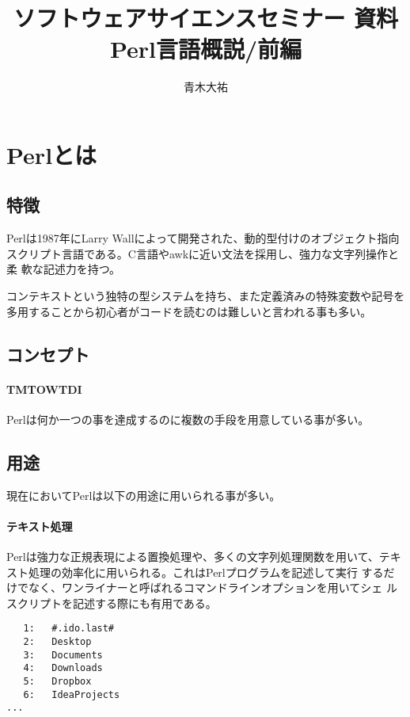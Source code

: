 \documentclass[a4paper,9pt]{jarticle}
\title{ソフトウェアサイエンスセミナー 資料 \\{\large{Perl言語概説/前編}}}
\author{青木大祐}
\begin{document}
\maketitle

\section{Perlとは}

\subsection{特徴}
Perlは1987年にLarry Wallによって開発された、動的型付けのオブジェクト指向
スクリプト言語である。C言語やawkに近い文法を採用し、強力な文字列操作と柔
軟な記述力を持つ。

コンテキストという独特の型システムを持ち、また定義済みの特殊変数や記号を
多用することから初心者がコードを読むのは難しいと言われる事も多い。

\subsection{コンセプト}
\paragraph{TMTOWTDI}
Perlは何か一つの事を達成するのに複数の手段を用意している事が多い。

\subsection{用途}
現在においてPerlは以下の用途に用いられる事が多い。
\paragraph*{テキスト処理}
Perlは強力な正規表現による置換処理や、多くの文字列処理関数を用いて、テキ
スト処理の効率化に用いられる。これはPerlプログラムを記述して実行
するだけでなく、ワンライナーと呼ばれるコマンドラインオプションを用いてシェ
ルスクリプトを記述する際にも有用である。

\begin{lstlisting}[caption=標準入力のソースに行番号を付けて標準出力へ]
% ls | perl -ple '$_=sprintf("%4d",$.).":\t".$_'
   1:	#.ido.last#
   2:	Desktop
   3:	Documents
   4:	Downloads
   5:	Dropbox
   6:	IdeaProjects
...
\end{lstlisting}　
\end{document}
